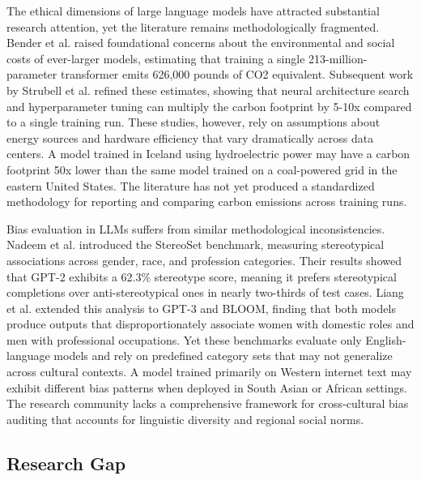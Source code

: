 \documentclass[journal]{IEEEtran}
\begin{document}
The ethical dimensions of large language models have attracted substantial research attention, yet the literature remains methodologically fragmented. Bender et al. \cite{r15} raised foundational concerns about the environmental and social costs of ever-larger models, estimating that training a single 213-million-parameter transformer emits 626,000 pounds of CO2 equivalent. Subsequent work by Strubell et al. \cite{r16} refined these estimates, showing that neural architecture search and hyperparameter tuning can multiply the carbon footprint by 5-10x compared to a single training run. These studies, however, rely on assumptions about energy sources and hardware efficiency that vary dramatically across data centers. A model trained in Iceland using hydroelectric power may have a carbon footprint 50x lower than the same model trained on a coal-powered grid in the eastern United States. The literature has not yet produced a standardized methodology for reporting and comparing carbon emissions across training runs.

Bias evaluation in LLMs suffers from similar methodological inconsistencies. Nadeem et al. \cite{r17} introduced the StereoSet benchmark, measuring stereotypical associations across gender, race, and profession categories. Their results showed that GPT-2 exhibits a 62.3\% stereotype score, meaning it prefers stereotypical completions over anti-stereotypical ones in nearly two-thirds of test cases. Liang et al. \cite{r18} extended this analysis to GPT-3 and BLOOM, finding that both models produce outputs that disproportionately associate women with domestic roles and men with professional occupations. Yet these benchmarks evaluate only English-language models and rely on predefined category sets that may not generalize across cultural contexts. A model trained primarily on Western internet text may exhibit different bias patterns when deployed in South Asian or African settings. The research community lacks a comprehensive framework for cross-cultural bias auditing that accounts for linguistic diversity and regional social norms.

\subsection{Research Gap}
\end{document}
